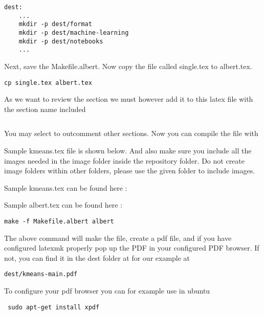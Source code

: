 \begin{lstlisting}
dest:
    ...
    mkdir -p dest/format
    mkdir -p dest/machine-learning
    mkdir -p dest/notebooks
    ...
\end{lstlisting}

Next, save the Makefile.albert.
Now copy the file called single.tex to albert.tex. 

\begin{lstlisting}
cp single.tex albert.tex
\end{lstlisting}

As we want to review the section we must however  add it to this latex
file with the section name included

\begin{lstlisting}

\end{lstlisting}

You may select to outcomment other sections.
Now you can compile the file with 

Sample kmeans.tex file is shown below. And also make sure you include
all the images needed in the image folder inside the repository folder.
Do not create image folders within other folders, please use the given
folder to include images. 

Sample kmeans.tex can be found here :



Sample albert.tex can be found here :

\begin{lstlisting}
make -f Makefile.albert albert
\end{lstlisting}


The above command will make the file, create a pdf file, and if you
have configured latexmk properly pop up the PDF in your configured PDF
browser. If not, you can find it in the dest folder at for our example
at 

\begin{lstlisting}
dest/kmeans-main.pdf
\end{lstlisting}


To configure your pdf browser you can for example use in ubuntu

\begin{lstlisting}
 sudo apt-get install xpdf
\end{lstlisting}


